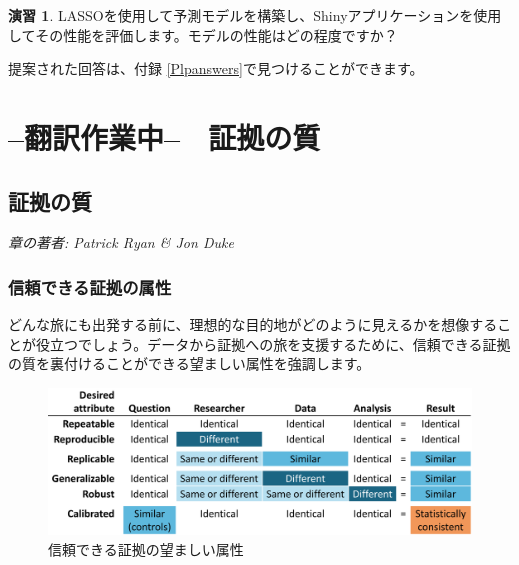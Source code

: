 \documentclass[
  11pt]{book}
\theoremstyle{definition}
\theoremstyle{definition}
\theoremstyle{definition}
\newtheorem{exercise}{演習}[chapter]
\theoremstyle{definition}
\theoremstyle{remark}
\begin{document}
\begin{exercise}
\protect\hypertarget{exr:exercisePlp3}{}\label{exr:exercisePlp3}LASSOを使用して予測モデルを構築し、Shinyアプリケーションを使用してその性能を評価します。モデルの性能はどの程度ですか？
\end{exercise}

提案された回答は、付録 \ref{Plpanswers}で見つけることができます。

\part{--翻訳作業中--　証拠の質}\label{part-ux7ffbux8a33ux4f5cux696dux4e2d-ux8a3cux62e0ux306eux8cea}

\chapter{証拠の質}\label{EvidenceQuality}

\emph{章の著者: Patrick Ryan \& Jon Duke}


\section{信頼できる証拠の属性}\label{ux4fe1ux983cux3067ux304dux308bux8a3cux62e0ux306eux5c5eux6027}

どんな旅にも出発する前に、理想的な目的地がどのように見えるかを想像することが役立つでしょう。データから証拠への旅を支援するために、信頼できる証拠の質を裏付けることができる望ましい属性を強調します。

\begin{figure}

{\centering \includegraphics[width=1\linewidth]{images/EvidenceQuality/reliableevidenceattributes} 

}

\caption{信頼できる証拠の望ましい属性}\label{fig:attributesOfEvidence}
\end{figure}
\end{document}
